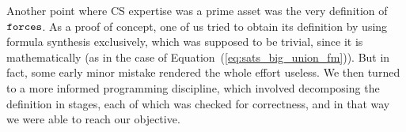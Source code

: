 Another point where CS expertise was a prime asset was
the very definition of $\mathop{\mathtt{forces}}$. As a
proof of concept, one of us tried to obtain its definition by
using formula synthesis exclusively, which was supposed to be trivial,
since it is mathematically (as in the case of
Equation~(\ref{eq:sats_big_union_fm})).
But in fact, some early minor mistake
rendered the whole effort useless. We then turned to a more
informed programming discipline, which involved decomposing the
definition in stages, each of which was checked for correctness, and
in that way we were able to reach our objective.


